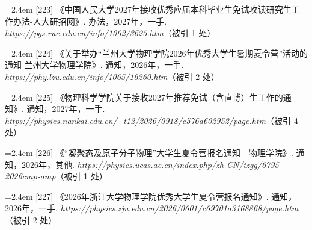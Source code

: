 {\vspace{0.6pt}
\noindent\hangindent=2.4em \label{src:S0287}{\color{cAccent}[223]} 《中国人民大学2027年接收优秀应届本科毕业生免试攻读研究生工作办法-人大研招网》. 办法，2027年，一手. \textit{https://pgs.ruc.edu.cn/info/1062/3625.htm}（被引 1 处）\par
\vspace{0.6pt}
\vspace{3.5pt}\par
\nopagebreak\vspace{1pt}
\noindent\hangindent=2.4em \label{src:S0290}{\color{cAccent}[224]} 《关于举办“兰州大学物理学院2026年优秀大学生暑期夏令营”活动的通知-兰州大学物理学院》. 通知，2026年，一手. \textit{https://phy.lzu.edu.cn/info/1065/16260.htm}（被引 2 处）\par
\vspace{0.6pt}
\vspace{3.5pt}\par
\nopagebreak\vspace{1pt}
\noindent\hangindent=2.4em \label{src:S0291}{\color{cAccent}[225]} 《物理科学学院关于接收2027年推荐免试（含直博）生工作的通知》. 通知，2027年，一手. \textit{https://physics.nankai.edu.cn/\_t12/2026/0918/c576a602952/page.htm}（被引 4 处）\par
\vspace{0.6pt}
\vspace{3.5pt}\par
\nopagebreak\vspace{1pt}
\noindent\hangindent=2.4em \label{src:S0292}{\color{cAccent}[226]} 《“凝聚态及原子分子物理”大学生夏令营报名通知 - 物理学院》. 通知，2026年，其他. \textit{https://physics.ucas.ac.cn/index.php/zh-CN/tzgg/6795-2026cmp-amp}（被引 1 处）\par
\vspace{0.6pt}
\vspace{3.5pt}\par
\nopagebreak\vspace{1pt}
\noindent\hangindent=2.4em \label{src:S0293}{\color{cAccent}[227]} 《2026年浙江大学物理学院优秀大学生夏令营报名通知》. 通知，2026年，一手. \textit{https://physics.zju.edu.cn/2026/0601/c69701a3168868/page.htm}（被引 2 处）\par
\vspace{0.6pt}
\vspace{3.5pt}\par
}
